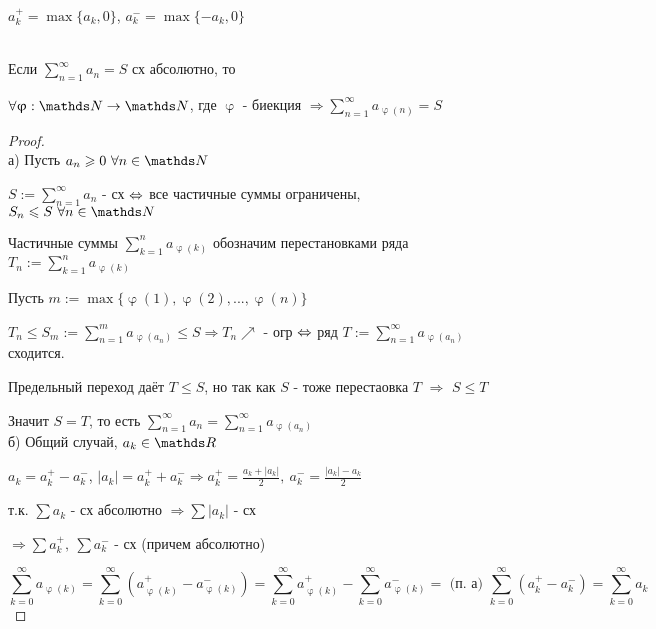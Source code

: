 \documentclass[12pt, fleqn]{article}
\begin{document}
\begin{Property}[3]
\begin{Property}[4]
\begin{Property}[2, аддитивность]
\begin{definition}
    $a_k^+ = \max\{a_k, 0\}$, $a_k^- = \max\{-a_k, 0\}$
\end{definition}

\begin{theorem}  \ \\
    Если $\sum\limits_{n=1}^\infty a_n= S$ сх абсолютно, то
    
    $\forall \upvarphi: \N \rightarrow \N$, где $\upvarphi$ - биекция $\Rightarrow \sum\limits_{n=1}^\infty a_{\upvarphi(n)} = S$
\end{theorem}

\begin{proof}\\
    а) Пусть $a_n \geqslant 0\ \forall n \in \N$
    
    $S := \sum\limits_{n=1}^\infty a_n$ - сх $\Leftrightarrow$ все частичные суммы ограничены,  $S_n \leqslant S\ \forall n \in \N$
    
    Частичные суммы $\sum\limits_{k=1}^n a_{\upvarphi(k)}$ обозначим перестановками ряда $T_n := \sum\limits_{k=1}^n a_{\upvarphi(k)}$
    
    Пусть $m:=\max \{\upvarphi(1), \upvarphi(2), ..., \upvarphi(n) \}$
    
    $T_n \leqslant S_m := \sum\limits_{n=1}^m a_{\upvarphi(a_n)} \leqslant S \Rightarrow T_n \nearrow$ - огр $\Leftrightarrow$ ряд $T := \sum\limits_{n=1}^\infty a_{\upvarphi(a_n)}$ сходится.
    
    Предельный переход даёт $T \leqslant S$, но так как $S$ - тоже перестаовка $T$ $\Rightarrow$ $S \leqslant T$

    Значит $S=T$, то есть $\sum\limits_{n=1}^\infty a_n = \sum\limits_{n=1}^\infty a_{\upvarphi(a_n)}$
    \\
    б) Общий случай, $a_k \in \R $
    
    $a_k = a_k^+ - a_k^-$, $|a_k| = a_k^+ + a_k^- \Rightarrow a_k^+ = \frac{a_k + |a_k|}{2},\ a_k^-=\frac{|a_k|-a_k}{2}$
    
    т.к. $\sum a_k$ - сх абсолютно $\Rightarrow \sum |a_k|$ - сх
    
    $\Rightarrow \sum a_k^+,\ \sum a_k^-$ - сх (причем абсолютно)
    
    $$\sum\limits_{k=0}^\infty a_{\upvarphi(k)} = \sum\limits_{k=0}^\infty (a_{\upvarphi(k)}^+ - a_{\upvarphi(k)}^-) = \sum\limits_{k=0}^\infty a_{\upvarphi(k)}^+ - \sum\limits_{k=0}^\infty a_{\upvarphi(k)}^- =\text{ (п. а) }\sum\limits_{k=0}^\infty (a_k^+ - a_k^-) = \sum\limits_{k=0}^\infty a_k$$
\end{proof}


\end{Property}
\end{Property}
\end{Property}
\end{document}
